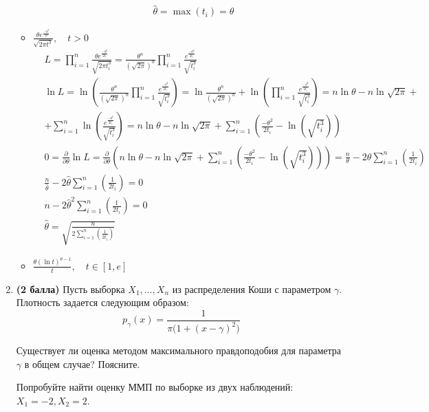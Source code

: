 \documentclass{assignment}
\begin{document}
\begin{enumerate}
\begin{itemize}
\begin{align*}
            &\hat{\theta} = \max (t_i) = \theta
        \end{align*}
        \finish
        \item $\displaystyle \frac{\theta e^{\frac{-\theta^2}{2t}}}{\sqrt{2 \pi t^3}}, \quad t > 0$
        \start
        \begin{align*}
            &L = \prod_{i=1}^{n} \frac{\theta e^{\frac{-\theta^2}{2t_i}}}{\sqrt{2 \pi t_i^3}} = \frac{\theta^n}{(\sqrt{2\pi})^n} \prod_{i=1}^{n} \frac{e^{\frac{-\theta^2}{2t_i}}}{\sqrt{t_i^3}} \\
            &\ln L = \ln (\frac{\theta^n}{(\sqrt{2\pi})^n} \prod_{i=1}^{n} \frac{e^{\frac{-\theta^2}{2t_i}}}{\sqrt{t_i^3}}) = \ln \frac{\theta^n}{(\sqrt{2\pi})^n} + \ln (\prod_{i=1}^{n} \frac{e^{\frac{-\theta^2}{2t_i}}}{\sqrt{t_i^3}}) = n\ln\theta - n\ln\sqrt{2\pi} + \\
            &+\sum_{i=1}^{n} \ln(\frac{e^{\frac{-\theta^2}{2t_i}}}{\sqrt{t_i^3}}) = n\ln\theta - n\ln\sqrt{2\pi} + \sum_{i=1}^{n} (\frac{-\theta^2}{2t_i} - \ln (\sqrt{t_i^3})) \\
            &0 = \frac{\partial}{\partial \theta}\ln L = \frac{\partial}{\partial \theta}(n\ln\theta - n\ln\sqrt{2\pi} + \sum_{i=1}^{n} (\frac{-\theta^2}{2t_i} - \ln (\sqrt{t_i^3}))) = \frac{n}{\theta} -2\theta \sum_{i=1}^{n} (\frac{1}{2t_i}) \\
            &\frac{n}{\hat{\theta}} -2\hat{\theta} \sum_{i=1}^{n} (\frac{1}{2t_i}) = 0 \\
            &n -2\hat{\theta}^2 \sum_{i=1}^{n} (\frac{1}{2t_i}) = 0 \\
            &\hat{\theta} = \sqrt{\frac{n}{2\sum_{i=1}^{n} (\frac{1}{2t_i})}}
        \end{align*}
        \finish
        \item $\displaystyle \frac{\theta (\ln{t})^{\theta - 1}}{t}, \quad t \in [1, e]$
    \end{itemize}

    \item \textbf{(2 балла)} Пусть выборка $X_1, \ldots, X_n$ из  распределения Коши с параметром $\gamma$. 
    Плотность задается следующим образом:
    $$
    p_{\gamma}(x) = \frac{1}{\pi \big(1 + (x - \gamma)^2\big)}
    $$

    Существует ли оценка методом максимального правдоподобия для параметра $\gamma$ в общем случае? Поясните.

    Попробуйте найти оценку ММП по выборке из двух наблюдений: $X_1 = -2, X_2 = 2$.
\end{enumerate}
    
\end{document}
